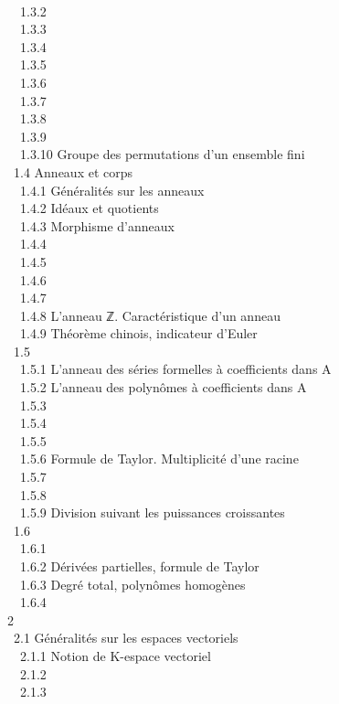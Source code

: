 \documentclass[]{article}
\begin{document}
\\ ~~1.3.2  \\ ~~1.3.3
 \\
~~1.3.4  \\
~~1.3.5  \\ ~~1.3.6
 \\ ~~1.3.7
 \\ ~~1.3.8
 \\ ~~1.3.9
 \\
~~1.3.10 {Groupe des permutations
d'un ensemble fini} \\ ~1.4 {Anneaux et
corps} \\ ~~1.4.1 {Généralités sur
les anneaux} \\ ~~1.4.2 {Idéaux et
quotients} \\ ~~1.4.3 {Morphisme
d'anneaux} \\ ~~1.4.4  \\
~~1.4.5  \\ ~~1.4.6
 \\
~~1.4.7  \\
~~1.4.8 {L'anneau ℤ. Caractéristique
d'un anneau} \\ ~~1.4.9 {Théorème
chinois, indicateur d'Euler} \\ ~1.5
 \\ ~~1.5.1
{L'anneau des séries formelles à
coefficients dans A} \\ ~~1.5.2
{L'anneau des polynômes à
coefficients dans A} \\ ~~1.5.3
 \\
~~1.5.4  \\ ~~1.5.5
 \\
~~1.5.6 {Formule de Taylor.
Multiplicité d'une racine} \\ ~~1.5.7
 \\
~~1.5.8  \\
~~1.5.9 {Division suivant les
puissances croissantes} \\ ~1.6
 \\
~~1.6.1  \\ ~~1.6.2
{Dérivées partielles, formule de
Taylor} \\ ~~1.6.3 {Degré total,
polynômes homogènes} \\ ~~1.6.4
 \\ 2
 \\ ~2.1
{Généralités sur les espaces
vectoriels} \\ ~~2.1.1 {Notion de
K-espace vectoriel} \\ ~~2.1.2
 \\
~~2.1.3  \\
\end{document}
